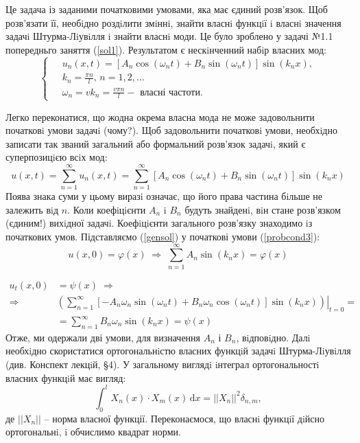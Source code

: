 Це задача із заданими початковими умовами, яка має єдиний розв'язок. Щоб розв’язати її, необiдно роздiлити змiннi, знайти власнi функцiї i власнi значення задачi Штурма-Лiувiлля i знайти власнi моди. Це було зроблено у  задачі №1.1 попередньго заняття (\ref{sol1}). Результатом є нескiнченний набiр власних мод: 
\begin{equation}
    \left\{ \begin{aligned} \label{fullsol}
        \;&u_n(x,t) = \left[A_n\cos(\omega_n t) + B_n\sin(\omega_n t)\right] \sin(k_n x), \\
        &k_n = \frac{\pi n}{l}, \, n = 1, 2,\ldots\\
        &\omega_n = vk_n = \frac{v \pi n}{l} - \text{ власні частоти}.
    \end{aligned}\right.
\end{equation}

Легко переконатися, що жодна окрема власна мода не може задовольнити початковi умови задачi (чому?). Щоб задовольнити початковi умови, необхiдно записати так званий загальний або формальний розв’язок задачi, який є суперпозицiєю всiх мод:
\begin{equation} \label{gensol}
    u(x,t) = \sum^{\infty}_{n=1} u_n(x,t) = \sum^{\infty}_{n=1} \left[A_n\cos(\omega_n t) + B_n\sin(\omega_n t)\right] \sin(k_n x)
\end{equation}
Поява знака суми у цьому виразi означає, що його права частина бiльше не залежить вiд $n$. Коли коефiцiєнти $A_n$ i $B_n$ будуть знайденi, вiн стане розв’язком (єдиним!) вихiдної задачi. Коефiцiєнти загального розв’язку знаходимо iз початкових умов. Підставляємо (\ref{gensol}) у початкові умови (\ref{probcond3}):
\begin{equation} \label{sol-init-pos}
    u(x,0) = \varphi(x) \;\Rightarrow\; \sum^{\infty}_{n=1} A_n\sin(k_n x) = \varphi(x)
\end{equation}

\begin{equation} \label{sol-init-vel}
    \begin{aligned}
        u_t(x,0) &= \psi(x)
        \;\Rightarrow\\
        \Rightarrow& \left.\left(\sum^{\infty}_{n=1}\left[-A_n\omega_n\sin(\omega_n t) + B_n\omega_n\cos(\omega_n t)\right] \sin(k_n x)\right)\right|_{t=0} =\\
        &= \sum^{\infty}_{n=1} B_n\omega_n\sin(k_n x) = \psi(x)
    \end{aligned}
\end{equation}
Отже, ми одержали дві умови, для визначення $A_n$ і $B_n$, вiдповiдно. Далi необхiдно скористатися ортогональнiстю власних функцiй задачi Штурма-Лiувiлля (див. Конспект лекцiй, §4). У загальному виглядi iнтеграл ортогональностi власних функцiй має вигляд:
\begin{equation} \label{orth}
    \int_0^l X_n(x) \cdot X_m(x) \,\mathrm{d}x = ||X_n||^2\delta_{n,m},
\end{equation}
де $||X_n||$ -- норма власної функції. Переконаємося, що власнi функцiї дiйсно ортогональнi, i обчислимо квадрат норми.

